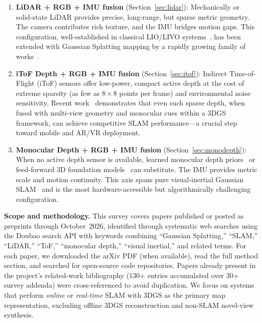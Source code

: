 \begin{enumerate}
    \item \textbf{LiDAR + RGB + IMU fusion} (Section~\ref{sec:lidar}):
    Mechanically or solid-state LiDAR provides precise, long-range, but
    sparse metric geometry.  The camera contributes rich texture, and the
    IMU bridges motion gaps.  This configuration, well-established in
    classical LIO/LIVO
    systems~\cite{xu2022fastlio2,zheng2024_fastlivo2,lin2024_r3live},
    has been extended with Gaussian Splatting mapping by a rapidly growing
    family of works~\cite{lang2026_gaussianlic2,lang2025_gaussianlic,
    hong2025_gslivo,xie2024_gslivm,zhao2025_lvigs,li2026_rmgs,
    tak2026_realtimelidar,he2026lvgsslam,shi2026_litgs}.

    \item \textbf{iToF Depth + RGB + IMU fusion} (Section~\ref{sec:itof}):
    Indirect Time-of-Flight (iToF) sensors offer low-power, compact active
    depth at the cost of extreme sparsity (as few as $8\times8$ points per
    frame) and environmental noise sensitivity.  Recent
    work~\cite{conti2025_tofsplatting} demonstrates that even such sparse
    depth, when fused with multi-view geometry and monocular cues within a
    3DGS framework, can achieve competitive SLAM performance---a crucial
    step toward mobile and AR/VR deployment.

    \item \textbf{Monocular Depth + RGB + IMU fusion} (Section~\ref{sec:monodepth}):
    When no active depth sensor is available, learned monocular depth
    priors~\cite{yang2024depthanythingv2} or feed-forward 3D foundation
    models~\cite{wang2025_vggt} can substitute.  The IMU provides metric
    scale and motion continuity.  This axis spans pure visual-inertial
    Gaussian SLAM~\cite{zhu2026_vigssslam,zhang2026_hislam2,
    seo2026_gaussianflow,zhou2026_geogs,zheng2025_wildgssslam,
    han2026_vggtgssslam,zhang2026_vimgs,deambrogi2026_cgssslam,
    sun2024_mm3dgs,zhu2026_mygosplat,kruzhkov2026_monoemgs} and is the
    most hardware-accessible but algorithmically challenging configuration.
\end{enumerate}

\textbf{Scope and methodology.}  This survey covers papers published or
posted as preprints through October~2026, identified through systematic web
searches using the Doubao search API with keywords combining ``Gaussian
Splatting,'' ``SLAM,'' ``LiDAR,'' ``ToF,'' ``monocular depth,'' ``visual
inertial,'' and related terms.  For each paper, we downloaded the arXiv PDF
(when available), read the full method section, and searched for open-source
code repositories.  Papers already present in the project's related-work
bibliography (130+ entries accumulated over 30+ survey addenda) were
cross-referenced to avoid duplication.  We focus on systems that perform
\emph{online} or \emph{real-time} SLAM with 3DGS as the primary map
representation, excluding offline 3DGS reconstruction and non-SLAM novel-view
synthesis.

